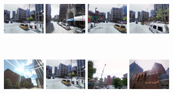 \begin{minipage}{0.75\linewidth}
    \begin{minipage}{\linewidth} 
        \colorbox{myGreen}{\includegraphics[height=16mm]{imgs/ex3/FVsvm1.jpg}}
        \colorbox{myRed}{\includegraphics[height=16mm]{imgs/ex3/FVsvm2.jpg}}
        \colorbox{myGreen}{\includegraphics[height=16mm]{imgs/ex3/FVsvm5.jpg}}
        \colorbox{myGreen}{\includegraphics[height=16mm]{imgs/ex3/FVsvm4.jpg}}
    \end{minipage}
    \\
    \begin{minipage}{\linewidth}
        \colorbox{myRed}{\includegraphics[height=16mm]{imgs/ex3/FV1.jpg}}
        \colorbox{myGreen}{\includegraphics[height=16mm]{imgs/ex3/FV2.jpg}}
        \colorbox{myRed}{\includegraphics[height=16mm]{imgs/ex3/FV3.jpg}}
        \colorbox{myRed}{\includegraphics[height=16mm]{imgs/ex3/FV4.jpg}}
    \end{minipage} 
\end{minipage}
